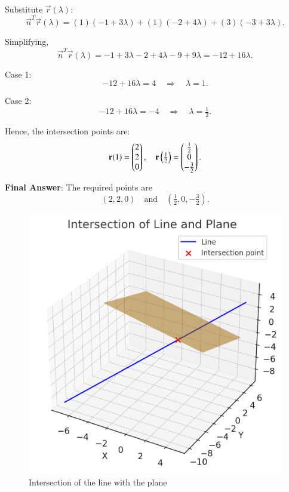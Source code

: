 \documentclass[journal]{IEEEtran}
\begin{document}
Substitute $\vec{r}(\lambda)$:
\begin{equation}
\vec{n}^T \vec{r}(\lambda) = (1)(-1+3\lambda) + (1)(-2+4\lambda) + (3)(-3+3\lambda).
\end{equation}

Simplifying,
\begin{equation}
\vec{n}^T \vec{r}(\lambda) = -1+3\lambda -2+4\lambda -9+9\lambda
= -12 + 16\lambda.
\end{equation}

Case 1: 
\begin{equation}
-12 + 16\lambda = 4 \quad \Rightarrow \quad \lambda = 1.
\end{equation}

Case 2:
\begin{equation}
-12 + 16\lambda = -4 \quad \Rightarrow \quad \lambda = \tfrac{1}{2}.
\end{equation}

Hence, the intersection points are:
\begin{equation}
\mathbf{r}(1) = \begin{pmatrix}2 \\ 2 \\ 0\end{pmatrix},
\quad
\mathbf{r}\left(\tfrac{1}{2}\right) = \begin{pmatrix}\tfrac{1}{2} \\ 0 \\ -\tfrac{3}{2}\end{pmatrix}.
\end{equation}

\textbf{Final Answer}: The required points are
\begin{equation}
(2,2,0) \quad \text{and} \quad \left(\tfrac{1}{2},0,-\tfrac{3}{2}\right).
\end{equation}

\begin{figure}[htbp]
    \centering
    \includegraphics[width=0.8\linewidth]{figs/fig1.jpg}
    \caption{Intersection of the line with the plane}
    \label{fig:fig1}
\end{figure}
\end{document}
